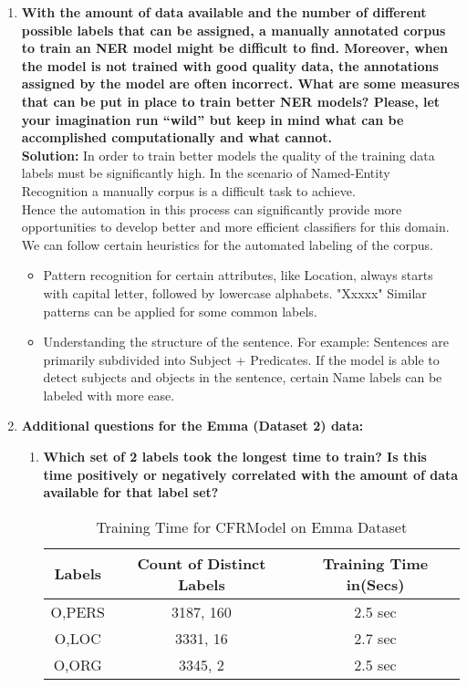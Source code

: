 \documentclass[12pt]{article}
\begin{document}
\begin{enumerate}
\item \textbf{With the amount of data available and the number of different possible labels that can be assigned, a manually annotated corpus to train an NER model might be difficult to find. Moreover, when the model is not trained with good quality data, the annotations assigned by the model are often incorrect. What are some measures that can be put in place to train better NER models? Please, let your imagination run “wild” but keep in mind what can be accomplished computationally and what cannot.
}\\

\textbf{Solution:}  In order to train better models the quality of the training data labels must be significantly high. In the scenario of Named-Entity Recognition a manually corpus is a difficult task to achieve.\\ Hence the automation in this process can significantly provide more opportunities to develop better and more efficient classifiers for this domain.\\ We can follow certain heuristics for the automated labeling of the corpus.
\begin{itemize}
\item Pattern recognition for certain attributes, like Location, always starts with capital letter, followed by lowercase alphabets. "Xxxxx" Similar patterns can be applied for some common labels.
\item Understanding the structure of the sentence. For example: Sentences are primarily subdivided into Subject + Predicates. If the model is able to detect subjects and objects in the sentence, certain Name labels can be labeled with more ease.\\
\end{itemize}



\item \textbf{Additional questions for the Emma (Dataset 2) data:}

\begin{enumerate}[label={\alph*.}]
\item \textbf{Which set of 2 labels took the longest time to train? Is this time positively or negatively correlated with the amount of data available for that label set?}
\begin{table}[ht!]
\centering
\begin{tabular}{ |c|c|c|} 
\hline 
\textbf{Labels} & \textbf{Count of Distinct Labels} & \textbf{Training Time in(Secs)} \\ [2ex]
\hline 
O,PERS & 3187, 160 & 2.5 sec\\ [1ex]
\hline 
O,LOC & 3331, 16 & 2.7 sec\\ [1ex]
\hline
O,ORG & 3345, 2 & 2.5 sec\\ [1ex]
\hline
\end{tabular}
\caption{Training Time for CFRModel on Emma Dataset}
\label{table:7}
\end{table}


\end{enumerate}
\end{enumerate}
\end{document}
